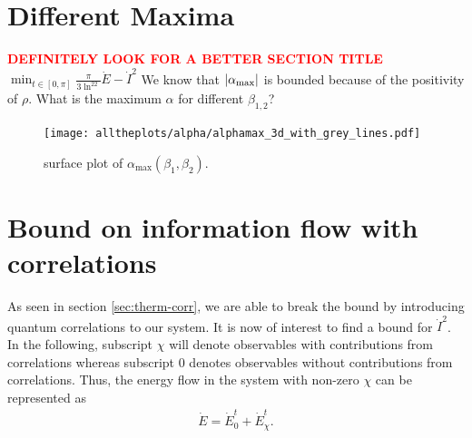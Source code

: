\documentclass{book}
\numberwithin{equation}{section} %
\begin{document}
\section{Different Maxima}
\textcolor{red}{\textbf{DEFINITELY LOOK FOR A BETTER SECTION TITLE}}
$\displaystyle\min_{t\in[0,\pi]}{\frac{\pi}{3\ln^22}\dot{E}-\dot{I}^2}$
We know that $\abs{\alpha_\text{max}}$ is bounded because of the positivity of $\rho$. What is the maximum $\alpha$ for different $\beta_{1,2}$?
\begin{figure}[h!]
    \centering
    \texttt{[image: alltheplots/alpha/alphamax\_3d\_with\_grey\_lines.pdf]}
    \caption{surface plot of $\alpha_\text{max}(\beta_1, \beta_2)$.}
\end{figure}

\newpage
\section{Bound on information flow with correlations}%
As seen in section \cref{sec:therm-corr}, we are able to break the bound by introducing quantum correlations to our system.
It is now of interest to find a bound for $\dot{I}^2$.
In the following, subscript $\chi$ will denote observables with contributions from correlations
whereas subscript $0$ denotes observables without contributions from correlations.
Thus, the energy flow in the system with non-zero $\chi$ can be represented as
\begin{align}
    \dot{E} = \dot{E}_0^t + \dot{E}_\chi^t.
\end{align}
\end{document}
